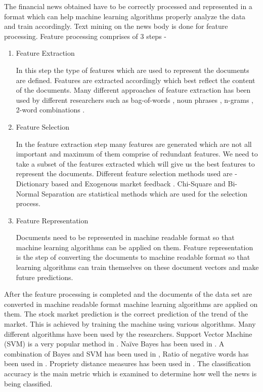 \documentclass[review,twocolumn,5p]{elsarticle}
\begin{document}
The financial news obtained have to be correctly processed and represented in a format which can help machine learning algorithms properly analyze the data and train accordingly. Text mining on the news body is done for feature processing. Feature processing comprises of 3 steps -

\begin{enumerate}
\item Feature Extraction

In this step the type of features which are used to represent the documents are defined. Features are extracted accordingly which best reflect the content of the documents. Many different approaches of feature extraction has been used by different researchers such as bag-of-words \cite{conf/wirtschaftsinformatik/GrothM09}\cite{1265201}\cite{725072}\cite{JOAR:JOAR382}\cite{antweiler2004all}, noun phrases \cite{Schumaker:2009}, n-grams \cite{butler:2009}, 2-word combinations \cite{Hagenau:2013}. 

\item Feature Selection

In the feature extraction step many features are generated which are not all important and maximum of them comprise of redundant features. We need to take a subset of the features extracted which will give us the best features to represent the documents. Different feature selection methods used are - Dictionary based \cite{JOFI:JOFI1362} and Exogenous market feedback \cite{groth2011intraday}\cite{Hagenau:2013}. Chi-Square and Bi-Normal Separation are statistical methods which are used for the selection process.

\item Feature Representation

Documents need to be represented in machine readable format so that machine learning algorithms can be applied on them. Feature representation is the step of converting the documents to machine readable format so that learning algorithms can train themselves on these document vectors and make future predictions. 
\end{enumerate}
After the feature processing is completed and the documents of the data set are converted in machine readable format machine learning algorithms are applied on them. The stock market prediction is the correct prediction of the trend of the market. This is achieved by training the machine using various algorithms. Many different algorithms have been used by the researchers. Support Vector Machine (SVM) is a very popular method in \cite{Schumaker:2009}\cite{conf/wirtschaftsinformatik/GrothM09}\cite{1265201}. Na\"{i}ve Bayes has been used in \cite{725072}. A combination of Bayes and SVM has been used in \cite{antweiler2004all}, Ratio of negative words has been used in \cite{JOFI:JOFI1362}. Propriety distance measures has been used in \cite{butler:2009}. The classification accuracy is the main metric which is examined to determine how well the news is being classified. 
\end{document}
